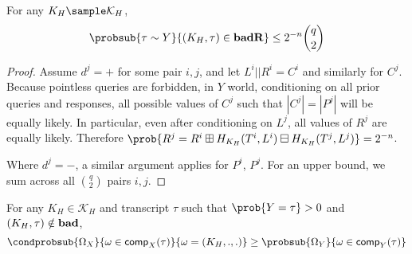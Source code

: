 \documentclass[eprint.tex]{subfiles}
\begin{document}
\begin{lemma} \label{badR}
    For any $K_H \sample \mathcal{K}_H$,
    \begin{displaymath}
        \probsub{\tau \sim Y}{(K_H, \tau) \in \badR}
        \leq 2^{-n} \binom{q}{2}
    \end{displaymath}
\end{lemma}

\begin{proof}
    Assume $d^j = +$ for some pair $i, j$, and let $L^i || R^i = C^i$ and similarly for $C^j$.
    Because pointless queries are forbidden, in $Y$ world,
    conditioning on all prior queries and responses,
    all possible values of $C^j$ such that $|C^j| = |P^j|$ will be equally likely.
    In particular, even after conditioning on $L^j$,
    all values of $R^j$ are equally likely. Therefore
    $\prob{R^j = R^i \boxplus H_{K_H}(T^i, L^i) \boxminus H_{K_H}(T^j, L^j)} = 2^{-n}$.

    Where $d^j = -$, a similar argument applies for $P^i$, $P^j$.
    For an upper bound, we sum across all $\binom{q}{2}$ pairs $i, j$.
\end{proof}

\begin{lemma} \label{notbad}
    For any $K_H \in \mathcal{K}_H$ and transcript $\tau$ such that $\prob{Y = \tau} > 0$ and
    $(K_H, \tau) \notin \operatorname{\mathbf{bad}}$,
    \begin{displaymath}
        \condprobsub{\Omega_X}{\omega \in \comp_X(\tau)}{\omega = (K_H, ., .)}
        \geq
        \probsub{\Omega_Y}{\omega \in \comp_Y(\tau)}
    \end{displaymath}
\end{lemma}
\end{document}
